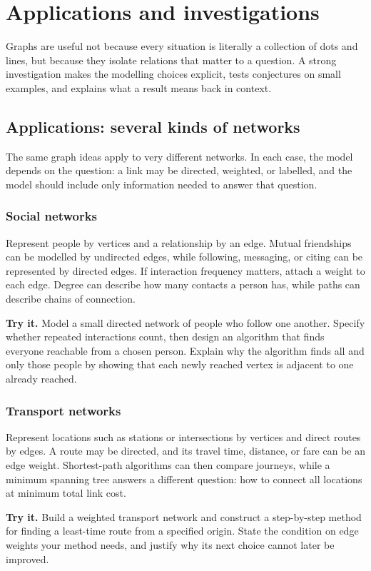 \chapter{Applications and investigations}
Graphs are useful not because every situation is literally a collection of dots and lines, but because they isolate relations that matter to a question. A strong investigation makes the modelling choices explicit, tests conjectures on small examples, and explains what a result means back in context.

\section{Applications: several kinds of networks}
The same graph ideas apply to very different networks. In each case, the model depends on the question: a link may be directed, weighted, or labelled, and the model should include only information needed to answer that question.

\subsection{Social networks}
Represent people by vertices and a relationship by an edge. Mutual friendships can be modelled by undirected edges, while following, messaging, or citing can be represented by directed edges. If interaction frequency matters, attach a weight to each edge. Degree can describe how many contacts a person has, while paths can describe chains of connection.

\textbf{Try it.} Model a small directed network of people who follow one another. Specify whether repeated interactions count, then design an algorithm that finds everyone reachable from a chosen person. Explain why the algorithm finds all and only those people by showing that each newly reached vertex is adjacent to one already reached.

\subsection{Transport networks}
Represent locations such as stations or intersections by vertices and direct routes by edges. A route may be directed, and its travel time, distance, or fare can be an edge weight. Shortest-path algorithms can then compare journeys, while a minimum spanning tree answers a different question: how to connect all locations at minimum total link cost.

\textbf{Try it.} Build a weighted transport network and construct a step-by-step method for finding a least-time route from a specified origin. State the condition on edge weights your method needs, and justify why its next choice cannot later be improved.

